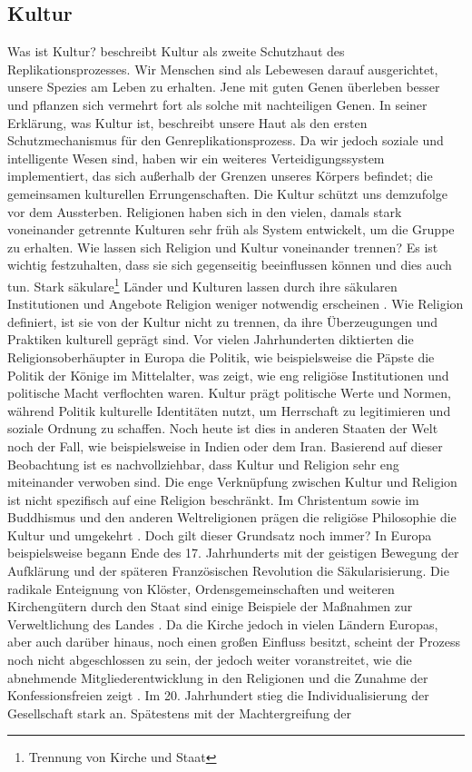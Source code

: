 \subsection{Kultur}    \label{subsec_2.1.2}
Was ist Kultur? \textcite{OxfordDic} beschreibt Kultur als zweite Schutzhaut des Replikationsprozesses. Wir Menschen sind als Lebewesen darauf ausgerichtet, unsere Spezies am Leben zu erhalten. Jene mit guten Genen überleben besser und pflanzen sich vermehrt fort als solche mit nachteiligen Genen. In seiner Erklärung, was Kultur ist, beschreibt \textcite{OxfordDic} unsere Haut als den ersten Schutzmechanismus für den Genreplikationsprozess. Da wir jedoch soziale und intelligente Wesen sind, haben wir ein weiteres Verteidigungssystem implementiert, das sich außerhalb der Grenzen unseres Körpers befindet; die gemeinsamen kulturellen Errungenschaften. Die Kultur schützt uns demzufolge vor dem Aussterben. Religionen haben sich in den vielen, damals stark voneinander getrennte Kulturen sehr früh als System entwickelt, um die Gruppe zu erhalten. Wie lassen sich Religion und Kultur voneinander trennen? Es ist wichtig festzuhalten, dass sie sich gegenseitig beeinflussen können und dies auch tun. Stark säkulare\footnote[1]{Trennung von Kirche und Staat} Länder und Kulturen lassen durch ihre säkularen Institutionen und Angebote Religion weniger notwendig erscheinen \parencite{ReliInKultur}. Wie \textcite{Durkeim} Religion definiert, ist sie von der Kultur nicht zu trennen, da ihre Überzeugungen und Praktiken kulturell geprägt sind. Vor vielen Jahrhunderten diktierten die Religionsoberhäupter in Europa die Politik, wie beispielsweise die Päpste die Politik der Könige im Mittelalter, was zeigt, wie eng religiöse Institutionen und politische Macht verflochten waren. Kultur prägt politische Werte und Normen, während Politik kulturelle Identitäten nutzt, um Herrschaft zu legitimieren und soziale Ordnung zu schaffen. Noch heute ist dies in anderen Staaten der Welt noch der Fall, wie beispielsweise in Indien oder dem Iran. Basierend auf dieser Beobachtung ist es nachvollziehbar, dass Kultur und Religion sehr eng miteinander verwoben sind. Die enge Verknüpfung zwischen Kultur und Religion ist nicht spezifisch auf eine Religion beschränkt. Im Christentum sowie im Buddhismus und den anderen Weltreligionen prägen die religiöse Philosophie die Kultur und umgekehrt \parencite{ReligionCultureandCommunication}. Doch gilt dieser Grundsatz noch immer? In Europa beispielsweise begann Ende des 17. Jahrhunderts mit der geistigen Bewegung der Aufklärung und der späteren Französischen Revolution die Säkularisierung. Die radikale Enteignung von Klöster, Ordensgemeinschaften und weiteren Kirchengütern durch den Staat sind einige Beispiele der Maßnahmen zur Verweltlichung des Landes \parencite{SchneiderToykaSeid2024}. Da die Kirche jedoch in vielen Ländern Europas, aber auch darüber hinaus, noch einen großen Einfluss besitzt, scheint der Prozess noch nicht abgeschlossen zu sein, der jedoch weiter voranstreitet, wie die abnehmende Mitgliederentwicklung in den Religionen und die Zunahme der Konfessionsfreien zeigt \parencite{FWiD2021}. Im 20. Jahrhundert stieg die Individualisierung der Gesellschaft stark an. Spätestens mit der Machtergreifung der 